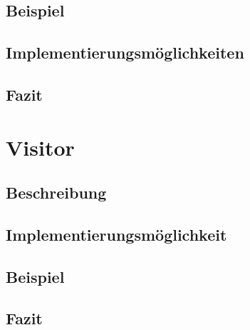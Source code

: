 \documentclass[a4paper,11pt]{scrartcl}
\begin{document}
\subsection{Beispiel}

\subsection{Implementierungsmöglichkeiten}

\subsection{Fazit}


\section{Visitor}

\subsection{Beschreibung}

\subsection{Implementierungsmöglichkeit}

\subsection{Beispiel}

\subsection{Fazit}





\end{document}
